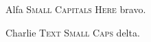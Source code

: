 \documentclass{article}
\begin{document}
Alfa {\scshape Small Capitals Here} bravo.

Charlie \textsc{Text Small Caps} delta.
\end{document}
